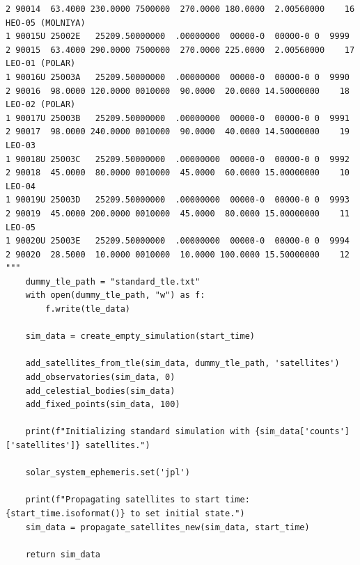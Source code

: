 \documentclass[11pt]{article}
\begin{document}
\begin{Verbatim}
2 90014  63.4000 230.0000 7500000  270.0000 180.0000  2.00560000    16
HEO-05 (MOLNIYA)
1 90015U 25002E   25209.50000000  .00000000  00000-0  00000-0 0  9999
2 90015  63.4000 290.0000 7500000  270.0000 225.0000  2.00560000    17
LEO-01 (POLAR)
1 90016U 25003A   25209.50000000  .00000000  00000-0  00000-0 0  9990
2 90016  98.0000 120.0000 0010000  90.0000  20.0000 14.50000000    18
LEO-02 (POLAR)
1 90017U 25003B   25209.50000000  .00000000  00000-0  00000-0 0  9991
2 90017  98.0000 240.0000 0010000  90.0000  40.0000 14.50000000    19
LEO-03
1 90018U 25003C   25209.50000000  .00000000  00000-0  00000-0 0  9992
2 90018  45.0000  80.0000 0010000  45.0000  60.0000 15.00000000    10
LEO-04
1 90019U 25003D   25209.50000000  .00000000  00000-0  00000-0 0  9993
2 90019  45.0000 200.0000 0010000  45.0000  80.0000 15.00000000    11
LEO-05
1 90020U 25003E   25209.50000000  .00000000  00000-0  00000-0 0  9994
2 90020  28.5000  10.0000 0010000  10.0000 100.0000 15.50000000    12
"""
    dummy_tle_path = "standard_tle.txt"
    with open(dummy_tle_path, "w") as f:
        f.write(tle_data)

    sim_data = create_empty_simulation(start_time)

    add_satellites_from_tle(sim_data, dummy_tle_path, 'satellites')
    add_observatories(sim_data, 0)
    add_celestial_bodies(sim_data)
    add_fixed_points(sim_data, 100)

    print(f"Initializing standard simulation with {sim_data['counts']['satellites']} satellites.")

    solar_system_ephemeris.set('jpl')

    print(f"Propagating satellites to start time: {start_time.isoformat()} to set initial state.")
    sim_data = propagate_satellites_new(sim_data, start_time)

    return sim_data
\end{Verbatim}
\end{document}
